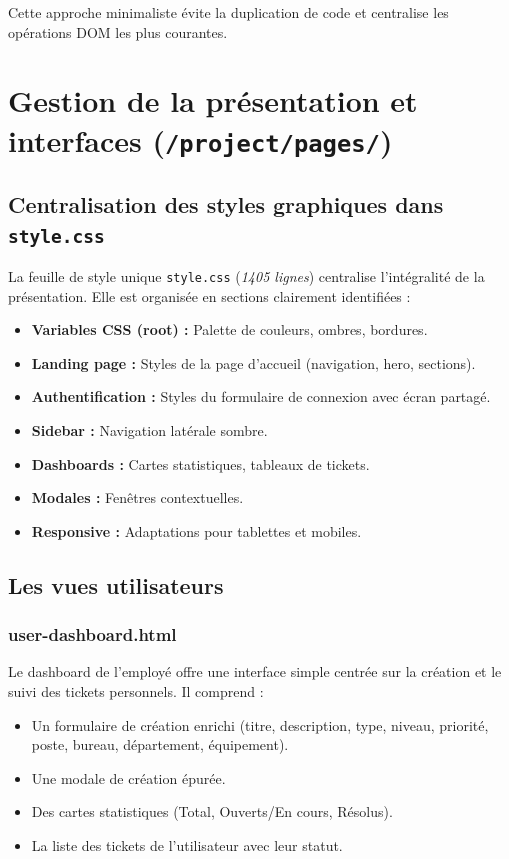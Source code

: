 \documentclass[12pt,a4paper,twoside]{report}
\begin{document}
Cette approche minimaliste évite la duplication de code et centralise les opérations DOM les plus courantes.

\section{Gestion de la présentation et interfaces (\texttt{/project/pages/})}

\subsection{Centralisation des styles graphiques dans \texttt{style.css}}

La feuille de style unique \texttt{style.css} (\textit{1405 lignes}) centralise l'intégralité de la présentation. Elle est organisée en sections clairement identifiées :

\begin{itemize}
    \item \textbf{Variables CSS (root) :} Palette de couleurs, ombres, bordures.
    \item \textbf{Landing page :} Styles de la page d'accueil (navigation, hero, sections).
    \item \textbf{Authentification :} Styles du formulaire de connexion avec écran partagé.
    \item \textbf{Sidebar :} Navigation latérale sombre.
    \item \textbf{Dashboards :} Cartes statistiques, tableaux de tickets.
    \item \textbf{Modales :} Fenêtres contextuelles.
    \item \textbf{Responsive :} Adaptations pour tablettes et mobiles.
\end{itemize}

\subsection{Les vues utilisateurs}

\subsubsection{user-dashboard.html}
Le dashboard de l'employé offre une interface simple centrée sur la création et le suivi des tickets personnels. Il comprend :
\begin{itemize}
    \item Un formulaire de création enrichi (titre, description, type, niveau, priorité, poste, bureau, département, équipement).
    \item Une modale de création épurée.
    \item Des cartes statistiques (Total, Ouverts/En cours, Résolus).
    \item La liste des tickets de l'utilisateur avec leur statut.
\end{itemize}
\end{document}
